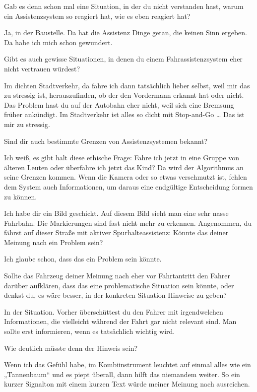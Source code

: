 \interviewerin
Gab es denn schon mal eine Situation, in der du nicht verstanden hast,
warum ein Assistenzsystem so reagiert hat, wie es eben reagiert hat?

Ja, in der Baustelle. Da hat die Assistenz Dinge getan, die keinen Sinn
ergeben. Da habe ich mich schon gewundert.

\interviewerin
Gibt es auch gewisse Situationen, in denen du einem Fahrassistenzsystem
eher nicht vertrauen würdest?

Im dichten Stadtverkehr, da fahre ich dann tatsächlich lieber selbst,
weil mir das zu stressig ist, herauszufinden, ob der den Vordermann
erkannt hat oder nicht. Das Problem hast du auf der Autobahn eher nicht,
weil sich eine Bremsung früher ankündigt. Im Stadtverkehr ist alles so
dicht mit Stop-and-Go … Das ist mir zu stressig.

\interviewerin
Sind dir auch bestimmte Grenzen von Assistenzsystemen bekannt?

Ich weiß, es gibt halt diese ethische Frage: Fahre ich jetzt in eine
Gruppe von älteren Leuten oder überfahre ich jetzt das Kind? Da wird der
Algorithmus an seine Grenzen kommen. Wenn die Kamera oder so etwas
verschmutzt ist, fehlen dem System auch Informationen, um daraus eine
endgültige Entscheidung formen zu können.

\interviewerin
Ich habe dir ein Bild geschickt. Auf diesem Bild sieht man eine sehr
nasse Fahrbahn. Die Markierungen sind fast nicht mehr zu erkennen.
Angenommen, du fährst auf dieser Straße mit aktiver Spurhalteassistenz:
Könnte das deiner Meinung nach ein Problem sein?

Ich glaube schon, dass das ein Problem sein könnte.

\interviewerin
Sollte das Fahrzeug deiner Meinung nach eher vor Fahrtantritt den Fahrer
darüber aufklären, dass das eine problematische Situation sein könnte,
oder denkst du, es wäre besser, in der konkreten Situation Hinweise zu
geben?

In der Situation. Vorher überschüttest du den Fahrer mit irgendwelchen
Informationen, die vielleicht während der Fahrt gar nicht relevant sind.
Man sollte erst informieren, wenn es tatsächlich wichtig wird.

\interviewerin
Wie deutlich müsste denn der Hinweis sein?

Wenn ich das Gefühl habe, im Kombiinstrument leuchtet auf einmal alles
wie ein „Tannenbaum“ und es piept überall, dann hilft das niemandem
weiter. So ein kurzer Signalton mit einem kurzen Text würde meiner
Meinung nach ausreichen.

